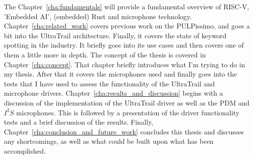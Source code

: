 The Chapter~\ref{cha:fundamentals} will provide a fundamental overview of RISC-V, 'Embedded AI', (embedded) Rust and microphone technology.\\
Chapter~\ref{cha:related_work} covers previous work on the PULPissimo, and goes a bit into the UltraTrail architecture.
Finally, it covers the state of keyword spotting in the industry.
It briefly goes into its use cases and then covers one of them a little more in depth.
The concept of the thesis is covered in Chapter~\ref{cha:concept}.
That chapter briefly introduces what I'm trying to do in my thesis.
After that it covers the microphones used and finally goes into the tests that I have used
to assess the functionality of the UltraTrail and microphone drivers.
Chapter~\ref{cha:results_and_discussion} begins with a discussion of the implementation
of the UltraTrail driver as well as the PDM and $I^2S$ microphones.
This is followed by a presentation of the driver functionality tests and a brief discussion of the results.
Finally, Chapter~\ref{cha:conclusion_and_future_work} concludes this thesis and discusses any shortcomings,
as well as what could be built upon what has been accomplished.
